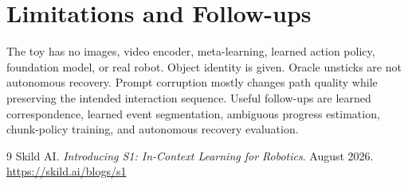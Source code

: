 \documentclass[11pt]{article}
\begin{document}
\section{Limitations and Follow-ups}
The toy has no images, video encoder, meta-learning, learned action policy, foundation model, or real robot. Object identity is given. Oracle unsticks are not autonomous recovery. Prompt corruption mostly changes path quality while preserving the intended interaction sequence. Useful follow-ups are learned correspondence, learned event segmentation, ambiguous progress estimation, chunk-policy training, and autonomous recovery evaluation.

\begin{thebibliography}{9}
 Skild AI. \emph{Introducing S1: In-Context Learning for Robotics}. August 2026. \url{https://skild.ai/blogs/s1}
\end{thebibliography}
\end{document}
